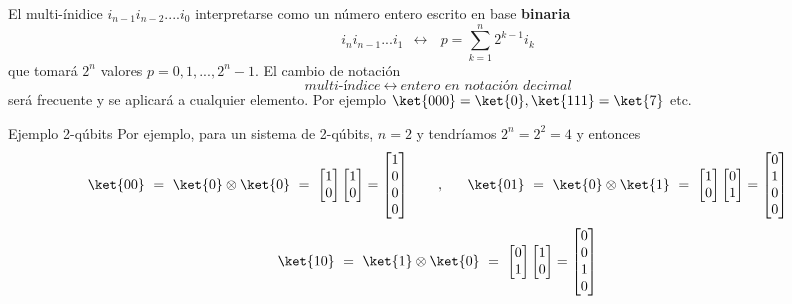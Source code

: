\documentclass[a4paper,11pt]{book} %
\numberwithin{equation}{chapter}
\begin{document}
El multi-ínidice $i_{n-1}i_{n-2}....i_0$ interpretarse como un número entero escrito en base \textbf{binaria}
	\begin{equation} \label{ec_multiqubit_notacion_binaria}
	\boxed{i_n i_{n-1}...i_1 ~~\longleftrightarrow ~~~p = \sum_{k=1}^n 2^{k-1} i_k}
	\end{equation}
que tomará  $2^n$ valores $p = 0,1,...,2^{n}-1$. El cambio de notación 
$$
\textit{multi-índice} ~ \leftrightarrow ~ \textit{entero en notación decimal} 
$$
será frecuente y se aplicará a cualquier elemento. Por ejemplo $\ket{000} = \ket{0}, \ket{111} = \ket{7}$ etc.	
	

	\begin{mybox_green}{Ejemplo 2-qúbits}
	Por ejemplo, para un sistema de 2-qúbits,   $n=2$ y tendríamos $2^n=2^2 = 4$ y entonces
	$$
\ket{00}~=~ \ket{0}\otimes \ket{0}~=~
\begin{bmatrix}1\\ 0\end{bmatrix}\begin{bmatrix}1\\ 0\end{bmatrix} = \begin{bmatrix}1\\0\\0 \\ 0\end{bmatrix}
~~~~~~,~~~~~
\ket{01}~=~ \ket{0}\otimes \ket{1}~=~
\begin{bmatrix}1\\ 0\end{bmatrix}\begin{bmatrix}0\\ 1\end{bmatrix} = \begin{bmatrix}0\\1\\0 \\ 0\end{bmatrix}
$$
$$
\ket{10}~=~ \ket{1}\otimes \ket{0}~=~
 \begin{bmatrix}0\\ 1\end{bmatrix}\begin{bmatrix}1\\ 0\end{bmatrix} = \begin{bmatrix}0\\0\\1 \\ 0\end{bmatrix}
$$
\end{mybox_green}
\end{document}
